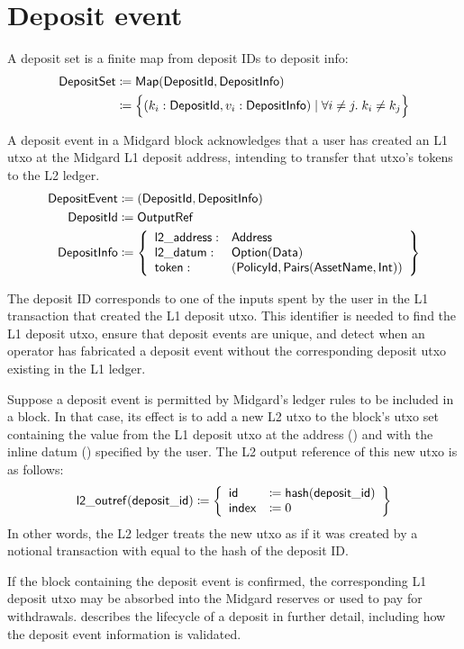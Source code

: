 \documentclass[../midgard.tex]{subfiles}
\begin{document}
\section{Deposit event}
\label{h:deposit-event}

A deposit set is a finite map from deposit IDs to deposit info:
\begin{align*}
    \mathsf{DepositSet} &\coloneq \mathsf{Map(DepositId, DepositInfo)} \\
      &\coloneq \Bigl\{
        (k_i: \mathsf{DepositId}, v_i: \mathsf{DepositInfo}) \mid \forall i \neq j.\; k_i \neq k_j
    \Bigr\}
\end{align*}

A deposit event in a Midgard block acknowledges that a user has created an L1 utxo at the Midgard L1 deposit address, intending to transfer that utxo's tokens to the L2 ledger.
\begin{align*}
    \mathsf{DepositEvent} &\coloneq (\mathsf{DepositId}, \mathsf{DepositInfo}) \\
    \mathsf{DepositId} &\coloneq \mathsf{OutputRef} \\
    \mathsf{DepositInfo} &\coloneq \left\{
        \begin{array}{ll}
            \mathsf{l2\_address} : & \mathsf{Address} \\
            \mathsf{l2\_datum} : & \mathsf{Option(Data)} \\
            \mathsf{token} : & \mathsf{(PolicyId, Pairs(AssetName, Int))}
        \end{array} \right\}
\end{align*}

The deposit ID corresponds to one of the inputs spent by the user in the L1 transaction that created the L1 deposit utxo.
This identifier is needed to find the L1 deposit utxo, ensure that deposit events are unique, and detect when an operator has fabricated a deposit event without the corresponding deposit utxo existing in the L1 ledger.

Suppose a deposit event is permitted by Midgard's ledger rules to be included in a block.
In that case, its effect is to add a new L2 utxo to the block's utxo set containing the value from the L1 deposit utxo at the address () and with the inline datum () specified by the user.
The L2 output reference of this new utxo is as follows: 
\begin{equation*}
    \mathsf{l2\_outref(deposit\_id)} \coloneq \left\{
    \begin{array}{ll}
        \mathsf{id} &\coloneq \mathsf{hash(deposit\_id)} \\
        \mathsf{index} &\coloneq 0
    \end{array} \right\}
\end{equation*}
In other words, the L2 ledger treats the new utxo as if it was created by a notional transaction with  equal to the hash of the deposit ID.

If the block containing the deposit event is confirmed, the corresponding L1 deposit utxo may be absorbed into the Midgard reserves or used to pay for withdrawals.
 describes the lifecycle of a deposit in further detail, including how the deposit event information is validated.
\end{document}
